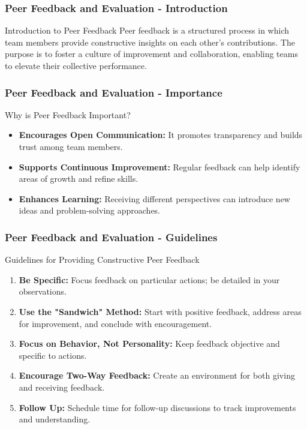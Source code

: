 \documentclass[aspectratio=169]{beamer}
\begin{document}
\begin{frame}[fragile]
    \frametitle{Peer Feedback and Evaluation - Introduction}
    \begin{block}{Introduction to Peer Feedback}
        Peer feedback is a structured process in which team members provide constructive insights on each other's contributions. The purpose is to foster a culture of improvement and collaboration, enabling teams to elevate their collective performance.
    \end{block}
\end{frame}

\begin{frame}[fragile]
    \frametitle{Peer Feedback and Evaluation - Importance}
    \begin{block}{Why is Peer Feedback Important?}
        \begin{itemize}
            \item \textbf{Encourages Open Communication:} It promotes transparency and builds trust among team members.
            \item \textbf{Supports Continuous Improvement:} Regular feedback can help identify areas of growth and refine skills.
            \item \textbf{Enhances Learning:} Receiving different perspectives can introduce new ideas and problem-solving approaches.
        \end{itemize}
    \end{block}
\end{frame}

\begin{frame}[fragile]
    \frametitle{Peer Feedback and Evaluation - Guidelines}
    \begin{block}{Guidelines for Providing Constructive Peer Feedback}
        \begin{enumerate}
            \item \textbf{Be Specific:} Focus feedback on particular actions; be detailed in your observations.
            \item \textbf{Use the "Sandwich" Method:} Start with positive feedback, address areas for improvement, and conclude with encouragement.
            \item \textbf{Focus on Behavior, Not Personality:} Keep feedback objective and specific to actions.
            \item \textbf{Encourage Two-Way Feedback:} Create an environment for both giving and receiving feedback.
            \item \textbf{Follow Up:} Schedule time for follow-up discussions to track improvements and understanding.
        \end{enumerate}
    \end{block}
\end{frame}
\end{document}
